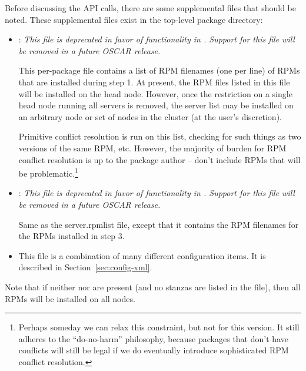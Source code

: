 Before discussing the API calls, there are some supplemental files
that should be noted.  These supplemental files exist in the top-level
package directory:

\begin{itemize}

\begchange

\item {}: {\em This file is deprecated in favor of
    functionality in .  Support for this file will be
    removed in a future OSCAR release.}
  
  This per-package file contains a list of RPM filenames (one per
  line) of RPMs that are installed during step 1.  At present, the RPM
  files listed in this file will be installed on the head node.
  However, once the restriction on a single head node running all
  servers is removed, the server list may be installed on an arbitrary
  node or set of nodes in the cluster (at the user's discretion).
  
  Primitive conflict resolution is run on this list, checking for such
  things as two versions of the same RPM, etc.  However, the majority
  of burden for RPM conflict resolution is up to the package author --
  don't include RPMs that will be problematic.\footnote{ Perhaps
    someday we can relax this constraint, but not for this version.
    It still adheres to the ``do-no-harm'' philosophy, because
    packages that don't have conflicts will still be legal if we do
    eventually introduce sophisticated RPM conflict resolution.}
  
\item {}: {\em This file is deprecated in favor of
    functionality in .  Support for this file will be
    removed in a future OSCAR release.}
  
  Same as the server.rpmlist file, except that it contains the RPM
  filenames for the RPMs installed in step 3.
  
\item {} This file is a combination of many different
  configuration items.  It is described in
  Section~\ref{sec:config-xml}.

\end{itemize}

Note that if neither  nor 
are present (and no  stanzas are listed in the
 file), then all RPMs will be installed on all nodes.

